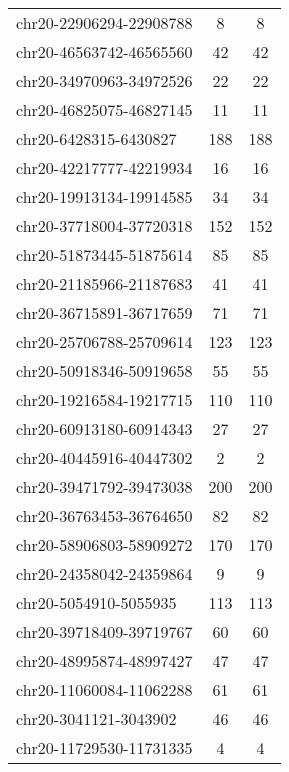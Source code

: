\documentclass[10pt,letterpaper]{article}
\begin{document}
{\begin{longtable}{lSS}
	chr20-22906294-22908788 & 8      & 8                     \\
	chr20-46563742-46565560 & 42     & 42                    \\
	chr20-34970963-34972526 & 22     & 22                    \\
	chr20-46825075-46827145 & 11     & 11                    \\
	chr20-6428315-6430827   & 188    & 188                   \\
	chr20-42217777-42219934 & 16     & 16                    \\
	chr20-19913134-19914585 & 34     & 34                    \\
	chr20-37718004-37720318 & 152    & 152                   \\
	chr20-51873445-51875614 & 85     & 85                    \\
	chr20-21185966-21187683 & 41     & 41                    \\
	chr20-36715891-36717659 & 71     & 71                    \\
	chr20-25706788-25709614 & 123    & 123                   \\
	chr20-50918346-50919658 & 55     & 55                    \\
	chr20-19216584-19217715 & 110    & 110                   \\
	chr20-60913180-60914343 & 27     & 27                    \\
	chr20-40445916-40447302 & 2      & 2                     \\
	chr20-39471792-39473038 & 200    & 200                   \\
	chr20-36763453-36764650 & 82     & 82                    \\
	chr20-58906803-58909272 & 170    & 170                   \\
	chr20-24358042-24359864 & 9      & 9                     \\
	chr20-5054910-5055935   & 113    & 113                   \\
	chr20-39718409-39719767 & 60     & 60                    \\
	chr20-48995874-48997427 & 47     & 47                    \\
	chr20-11060084-11062288 & 61     & 61                    \\
	chr20-3041121-3043902   & 46     & 46                    \\
	chr20-11729530-11731335 & 4      & 4                     \\

\end{longtable}}
\end{document}
